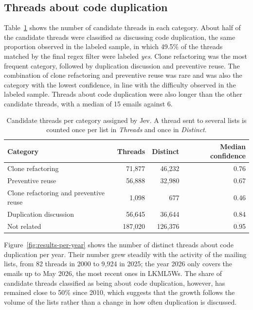 \subsection{Threads about code duplication}
\label{sec:results-threads}

Table~\ref{tab:results-categories} shows the number of candidate threads in each category. About half of the candidate threads were classified as discussing code duplication, the same proportion observed in the labeled sample, in which 49.5\% of the threads matched by the final regex filter were labeled \emph{yes}. Clone refactoring was the most frequent category, followed by duplication discussion and preventive reuse. The combination of clone refactoring and preventive reuse was rare and was also the category with the lowest confidence, in line with the difficulty observed in the labeled sample. Threads about code duplication were also longer than the other candidate threads, with a median of 15 emails against 6.

\begin{table}[htbp]
    \centering
    \caption{Candidate threads per category assigned by Jev. A thread sent to several lists is counted once per list in \emph{Threads} and once in \emph{Distinct}.}
    \label{tab:results-categories}
    \begin{tabular}{lrrr}
        \hline
        Category & Threads & Distinct & Median confidence \\
        \hline
        Clone refactoring                       &  71,877 &  46,232 & 0.76 \\
        Preventive reuse                        &  56,888 &  32,980 & 0.67 \\
        Clone refactoring and preventive reuse  &   1,098 &     677 & 0.46 \\
        Duplication discussion                  &  56,645 &  36,644 & 0.84 \\
        Not related                             & 187,020 & 126,376 & 0.95 \\
        \hline
    \end{tabular}
\end{table}

Figure~\ref{fig:results-per-year} shows the number of distinct threads about code duplication per year. Their number grew steadily with the activity of the mailing lists, from 82 threads in 2000 to 9,924 in 2025; the year 2026 only covers the emails up to May 2026, the most recent ones in LKML5Ws. The share of candidate threads classified as being about code duplication, however, has remained close to 50\% since 2010, which suggests that the growth follows the volume of the lists rather than a change in how often duplication is discussed.

